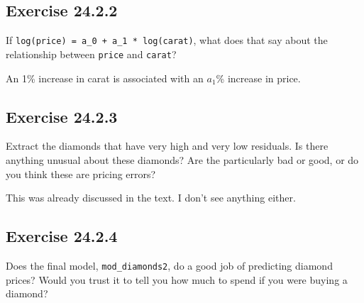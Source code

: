 \documentclass[]{book}
\newenvironment{Shaded}{\begin{snugshade}}{\end{snugshade}}
\newcommand{\CommentTok}[1]{\textcolor[rgb]{0.56,0.35,0.01}{\textit{#1}}}
\newcommand{\DataTypeTok}[1]{\textcolor[rgb]{0.13,0.29,0.53}{#1}}
\newcommand{\DecValTok}[1]{\textcolor[rgb]{0.00,0.00,0.81}{#1}}
\newcommand{\FloatTok}[1]{\textcolor[rgb]{0.00,0.00,0.81}{#1}}
\newcommand{\KeywordTok}[1]{\textcolor[rgb]{0.13,0.29,0.53}{\textbf{#1}}}
\newcommand{\NormalTok}[1]{#1}
\newcommand{\OperatorTok}[1]{\textcolor[rgb]{0.81,0.36,0.00}{\textbf{#1}}}
\newcommand{\StringTok}[1]{\textcolor[rgb]{0.31,0.60,0.02}{#1}}
\theoremstyle{plain}
\theoremstyle{remark}
\begin{document}
\hypertarget{exercise-24.2.2}{%
\subsection*{\texorpdfstring{Exercise
{24.2.2}}{Exercise 24.2.2}}\label{exercise-24.2.2}}

If \texttt{log(price)\ =\ a\_0\ +\ a\_1\ *\ log(carat)}, what does that
say about the relationship between \texttt{price} and \texttt{carat}?

An 1\% increase in carat is associated with an \(a_1\)\% increase in
price.

\hypertarget{exercise-24.2.3}{%
\subsection*{\texorpdfstring{Exercise
{24.2.3}}{Exercise 24.2.3}}\label{exercise-24.2.3}}

Extract the diamonds that have very high and very low residuals. Is
there anything unusual about these diamonds? Are the particularly bad or
good, or do you think these are pricing errors?

This was already discussed in the text. I don't see anything either.

\hypertarget{exercise-24.2.4}{%
\subsection*{\texorpdfstring{Exercise
{24.2.4}}{Exercise 24.2.4}}\label{exercise-24.2.4}}

Does the final model, \texttt{mod\_diamonds2}, do a good job of
predicting diamond prices? Would you trust it to tell you how much to
spend if you were buying a diamond?

\begin{Shaded}
\end{Shaded}
\end{document}

